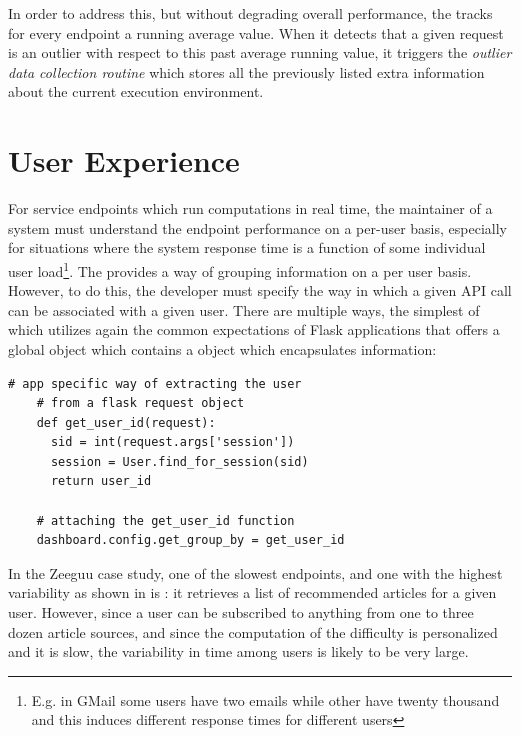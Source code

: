 \documentclass[conference]{IEEEtran}
\begin{document}
  In order to address this, but without degrading overall performance, the \tool tracks for every endpoint a running average value. When it detects that a given request is an outlier with respect to this past average running value, it triggers the {\em outlier data collection routine} which stores all the previously listed extra information about the current execution environment. 

\newpage
\section {User Experience}
\label{sec:user}

  For service endpoints which run computations in real time, the maintainer of a system must understand the endpoint performance on a per-user basis, especially for situations where the system response time is a function of some individual user load\footnote{E.g. in GMail some users have two emails while other have twenty thousand and this induces different response times for different users}.
%
  The \tool provides a way of grouping information on a per user basis. However, to do this, the developer must specify the way in which a given API call can be associated with a given user. There are multiple ways, the simplest of which utilizes again the common expectations of Flask applications that offers a global  object which contains a  object which encapsulates information: 

  \begin{lstlisting}[style=custompython]  
    # app specific way of extracting the user
    # from a flask request object    
    def get_user_id(request):
      sid = int(request.args['session'])
      session = User.find_for_session(sid)
      return user_id

    # attaching the get_user_id function
    dashboard.config.get_group_by = get_user_id

  \end{lstlisting}

  In the Zeeguu case study, one of the slowest endpoints, and one with the highest variability as shown in  is \epFeedItems: it retrieves a list of recommended articles for a given user. However, since a user can be subscribed to anything from one to three dozen article sources, and since the computation of the difficulty is personalized and it is slow, the variability in time among users is likely to be very large. 
\end{document}
